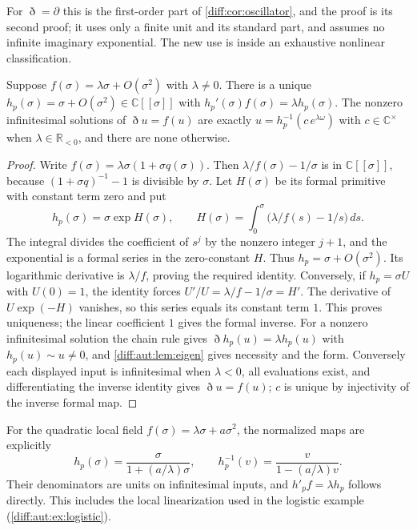 \documentclass[11pt,letterpaper]{article}
\numberwithin{equation}{section}
\theoremstyle{definition}
\theoremstyle{remark}
\newcommand{\R}{\mathbb R}
\newcommand{\C}{\mathbb C}
\newcommand{\der}{\partial}
\newcommand{\Dn}{\eth}
\begin{document}
For $\Dn=\der$ this is the first-order part of \cref{diff:cor:oscillator}, and the
proof is its second proof; it uses only a finite unit and its standard part, and
assumes no infinite imaginary exponential. The new use is inside an exhaustive
nonlinear classification.

\begin{proposition}
\label{diff:aut:prop:simple}
Suppose $f(\sigma)=\lambda\sigma+O(\sigma^{2})$ with $\lambda\neq0$. There is a
unique $h_{p}(\sigma)=\sigma+O(\sigma^{2})\in\C[[\sigma]]$ with
$h_{p}'(\sigma)f(\sigma)=\lambda h_{p}(\sigma)$. The nonzero infinitesimal
solutions of $\Dn u=f(u)$ are exactly $u=h_{p}^{-1}(c\,e^{\lambda\omega})$ with
$c\in\C^{\times}$ when $\lambda\in\R_{<0}$, and there are none otherwise.
\end{proposition}
\begin{proof}
Write $f(\sigma)=\lambda\sigma(1+\sigma q(\sigma))$. Then
$\lambda/f(\sigma)-1/\sigma$ is in $\C[[\sigma]]$, because
$(1+\sigma q)^{-1}-1$ is divisible by $\sigma$. Let $H(\sigma)$
be its formal primitive with constant term zero and put
\[
 h_p(\sigma)=\sigma\exp H(\sigma),\qquad
 H(\sigma)=\int_0^\sigma\bigl(\lambda/f(s)-1/s\bigr)\,ds .
\]
The integral divides the coefficient of $s^j$ by the nonzero integer
$j+1$, and the exponential is a formal series in the zero-constant
$H$. Thus $h_p=\sigma+O(\sigma^2)$. Its logarithmic derivative is
$\lambda/f$, proving the required identity. Conversely, if
$h_p=\sigma U$ with $U(0)=1$, the identity forces
$U'/U=\lambda/f-1/\sigma=H'$. The derivative of $U\exp(-H)$
vanishes, so this series equals its constant term $1$. This proves
uniqueness; the linear coefficient $1$ gives the formal inverse. For a
nonzero infinitesimal solution the chain rule gives $\Dn h_{p}(u)=\lambda h_{p}(u)$
with $h_{p}(u)\sim u\neq0$, and \cref{diff:aut:lem:eigen} gives necessity and the
form. Conversely each displayed input is infinitesimal when $\lambda<0$, all
evaluations exist, and differentiating the inverse identity gives $\Dn u=f(u)$;
$c$ is unique by injectivity of the inverse formal map.
\end{proof}

For the quadratic local field $f(\sigma)=\lambda\sigma+a\sigma^2$,
the normalized maps are explicitly
\[
 h_p(\sigma)=\frac{\sigma}{1+(a/\lambda)\sigma},
 \qquad h_p^{-1}(v)=\frac{v}{1-(a/\lambda)v}.
\]
Their denominators are units on infinitesimal inputs, and
$h'_pf=\lambda h_p$ follows directly. This includes the local
linearization used in the logistic example
(\cref{diff:aut:ex:logistic}).
\end{document}
